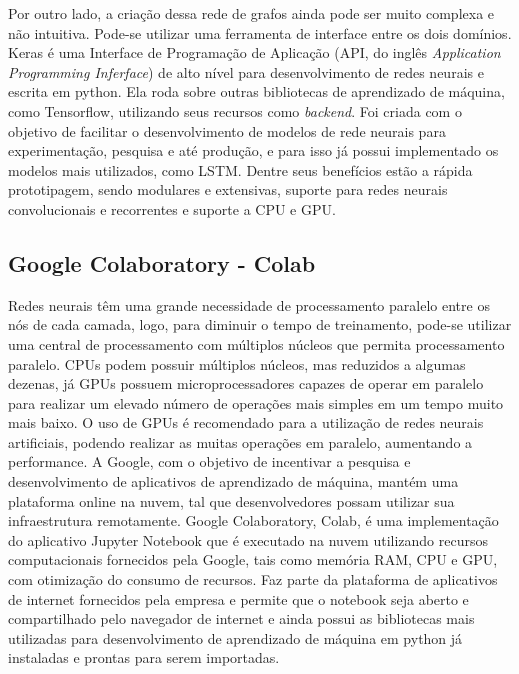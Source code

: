 \documentclass[
	12pt,				%
	oneside,			%
	a4paper,			%
	english,			%
	brazil				%
	]{abntex2}
\begin{document}
	
	Por outro lado, a criação dessa rede de grafos ainda pode ser muito complexa e não intuitiva. Pode-se utilizar uma ferramenta de interface entre os dois domínios. Keras é uma Interface de Programação de Aplicação (API, do inglês \textit{Application Programming Inferface}) de alto nível para desenvolvimento de redes neurais e escrita em python. Ela roda sobre outras bibliotecas de aprendizado de máquina, como Tensorflow, utilizando seus recursos como \textit{backend}. Foi criada com o objetivo de facilitar o desenvolvimento de modelos de rede neurais para experimentação, pesquisa e até produção, e para isso já possui implementado os modelos mais utilizados, como LSTM. Dentre seus benefícios estão a rápida prototipagem, sendo modulares e extensivas, suporte para redes neurais convolucionais e recorrentes e suporte a CPU e GPU.
	

\subsection{Google Colaboratory - Colab}

	Redes neurais têm uma grande necessidade de processamento paralelo entre os nós de cada camada, logo, para diminuir o tempo de treinamento, pode-se utilizar uma central de processamento com múltiplos núcleos que permita processamento paralelo. CPUs podem possuir múltiplos núcleos, mas reduzidos a algumas dezenas, já GPUs possuem microprocessadores capazes de operar em paralelo para realizar um elevado número de operações mais simples em um tempo muito mais baixo. O uso de GPUs é recomendado para a utilização de redes neurais artificiais, podendo realizar as muitas operações em paralelo, aumentando a performance. A Google, com o objetivo de incentivar a pesquisa e desenvolvimento de aplicativos de aprendizado de máquina, mantém uma plataforma online na nuvem, tal que desenvolvedores possam utilizar sua infraestrutura remotamente. Google Colaboratory, Colab, é uma implementação do aplicativo Jupyter Notebook que é executado na nuvem utilizando recursos computacionais fornecidos pela Google, tais como memória RAM, CPU e GPU, com otimização do consumo de recursos. Faz parte da plataforma de aplicativos de internet fornecidos pela empresa e permite que o notebook seja aberto e compartilhado pelo navegador de internet e ainda possui as bibliotecas mais utilizadas para desenvolvimento de aprendizado de máquina em python já instaladas e prontas para serem importadas. 
	
\end{document}
